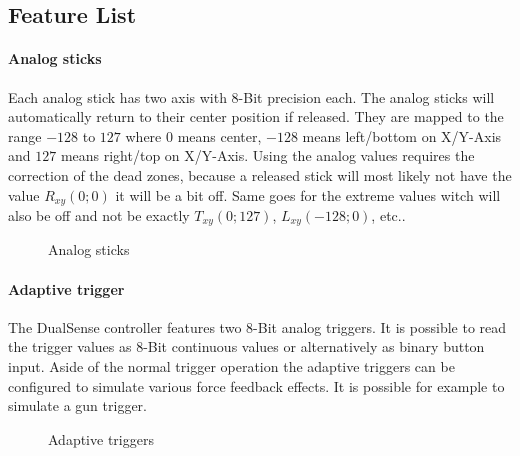 \subsection{Feature List}

\paragraph{Analog sticks}
Each analog stick has two axis with 8-Bit precision each. The analog sticks will automatically return to their center position if released. They are mapped to the range $-128$ to $127$ where $0$ means center, $-128$ means left/bottom on X/Y-Axis and $127$ means right/top on X/Y-Axis. Using the analog values requires the correction of the dead zones, because a released stick will most likely not have the value $R_{xy}(0; 0)$ it will be a bit off. Same goes for the extreme values witch will also be off and not be exactly $T_{xy}(0; 127)$, $L_{xy}(-128; 0)$, etc..
\begin{figure}[H]
    \centering
    \caption{Analog sticks}
\end{figure}

\paragraph{Adaptive trigger}
The DualSense controller features two 8-Bit analog triggers. It is possible to read the trigger values as 8-Bit continuous values or alternatively as binary button input. Aside of the normal trigger operation the adaptive triggers can be configured to simulate various force feedback effects. It is possible for example to simulate a gun trigger.
\begin{figure}[H]
    \centering
    \caption{Adaptive triggers}
\end{figure}

